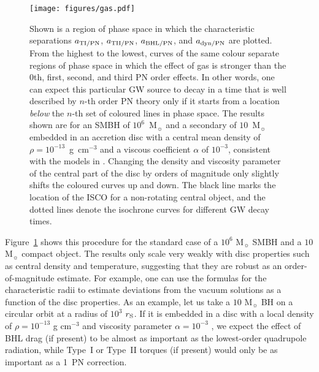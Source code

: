 \documentclass[usenatbib]{mnras}
\begin{document}
\begin{figure}
    \centering
    \texttt{[image: figures/gas.pdf]}
    \caption{Shown is a region of phase space in which the characteristic separations $a_{\rm{TI/PN}}$, $a_{\rm{TII/PN}}$, $a_{\rm{BHL/PN}}$, and $a_{\rm{dyn/PN}}$ are plotted. From the highest to the lowest, curves of the same colour separate regions of phase space in which the effect of gas is stronger than the 0th, first, second, and third PN order effects. In other words, one can expect this particular GW source to decay in a time that is well described by $n$-th order PN theory only if it starts from a location \textit{below} the $n$-th set of coloured lines in phase space. The results shown are for an SMBH of $10^6$~M$_{\sun}$ and a secondary of $10$~M$_{\sun}$ embedded in an accretion disc with a central mean density of $\rho=10^{-13}$~g~cm$^{-3}$ and a viscous coefficient $\alpha$ of $10^{-3}$, consistent with the models in \citet{2009ASPC..408..128T} . Changing the density and viscosity parameter of the central part of the disc by orders of magnitude only slightly shifts the coloured curves up and down. The black line marks the location of the ISCO for a non-rotating central object, and the dotted lines denote the isochrone curves for different GW decay times.}
    \label{fig:gas}
\end{figure}

Figure~\ref{fig:gas} shows this procedure for the standard case of a $10^6$ M$_{\sun}$ SMBH and a $10$ M$_{\sun}$ compact object. The results only scale very weakly with disc properties such as central density and temperature, suggesting that they are robust as an order-of-magnitude estimate. For example, one can use the formulas for the characteristic radii to estimate deviations from the vacuum solutions as a function of the disc properties. As an example, let us take a $10$ M$_{\sun}$ BH on a circular orbit at a radius of $10^3$ $r_{\rm S}$. If it is embedded in a disc with a local density of $\rho=10^{-13}$ g cm$^{-3}$ and viscosity parameter $\alpha = 10^{-3}$  \citep{2009ASPC..408..128T}, we expect the effect of BHL drag (if present) to be almost as important as the lowest-order quadrupole radiation, while Type~I or Type~II torques (if present) would only be as important as a 1~PN correction.
\end{document}
